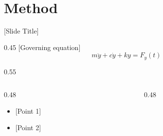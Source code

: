 \section{Method}

\begin{frame}{[Slide Title]}
  \begin{rows}
    \begin{row}{0.45}
      [Governing equation]
      \[ m\ddot{y} + c\dot{y} + k y = F_y(t) \]
    \end{row}
    \begin{row}[t]{0.55}
      \begin{columns}[T]
        \begin{column}{0.48\textwidth}
          \begin{itemize}
            \item {[Point 1]}
            \item {[Point 2]}
          \end{itemize}
        \end{column}
        \begin{column}{0.48\textwidth}
          \centering
          \FigurePlaceholder{2.5cm}{[Figure]}
        \end{column}
      \end{columns}
    \end{row}
  \end{rows}
\end{frame}
